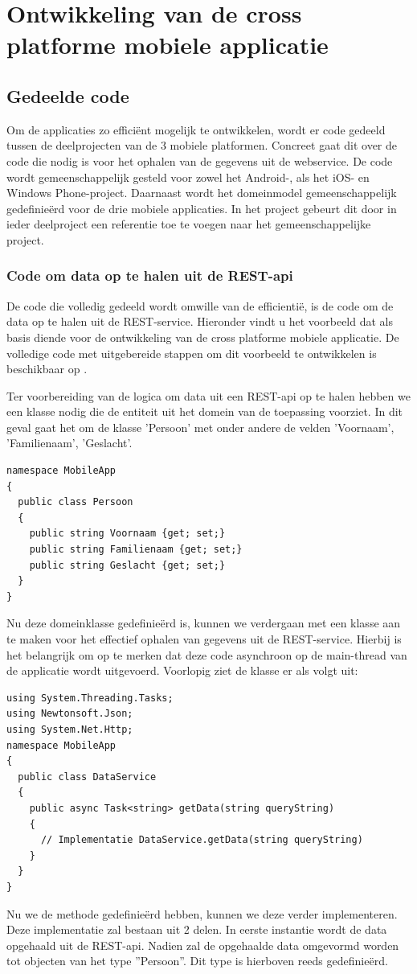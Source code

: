 \section{Ontwikkeling van de cross platforme mobiele applicatie}
\subsection{Gedeelde code}
Om de applicaties zo efficiënt mogelijk te ontwikkelen, wordt er code gedeeld tussen de deelprojecten van de 3 mobiele
platformen. Concreet gaat dit over de code die nodig is voor het ophalen van de gegevens uit de webservice. De code wordt gemeenschappelijk
gesteld voor zowel het Android-, als het iOS- en Windows Phone-project. Daarnaast wordt het domeinmodel gemeenschappelijk
gedefinieërd voor de drie mobiele applicaties. In het project gebeurt dit door in ieder deelproject een referentie toe te voegen
naar het gemeenschappelijke project.

\subsubsection{Code om data op te halen uit de REST-api}
De code die volledig gedeeld wordt omwille van de efficientië, is de code om de data op te halen uit de REST-service.
Hieronder vindt u het voorbeeld dat als basis diende voor de ontwikkeling van de cross platforme mobiele applicatie.
De volledige code met uitgebereide stappen om dit voorbeeld te ontwikkelen is beschikbaar op \citet{buildappwithnativeuiusingxamarininvisualstudio2017}.

Ter voorbereiding van de logica om data uit een REST-api op te halen hebben we een klasse nodig die de entiteit uit het
domein van de toepassing voorziet. In dit geval gaat het om de klasse 'Persoon'  met onder andere de velden 'Voornaam', 'Familienaam', 'Geslacht'.
\newpage
\begin{lstlisting}
namespace MobileApp
{
  public class Persoon
  {
    public string Voornaam {get; set;}
    public string Familienaam {get; set;}
    public string Geslacht {get; set;}
  }
}
\end{lstlisting}
Nu deze domeinklasse gedefinieërd is, kunnen we verdergaan met een klasse aan te maken voor het effectief ophalen van
gegevens uit de REST-service. Hierbij is het belangrijk om op te merken dat deze code asynchroon op de main-thread van de
applicatie wordt uitgevoerd. Voorlopig ziet de klasse er als volgt uit:
\begin{lstlisting}
using System.Threading.Tasks;
using Newtonsoft.Json;
using System.Net.Http;
namespace MobileApp
{
  public class DataService
  {
    public async Task<string> getData(string queryString)
    {
      // Implementatie DataService.getData(string queryString)
    }
  }
}
\end{lstlisting}
Nu we de methode gedefinieërd hebben, kunnen we deze verder implementeren.
Deze implementatie zal bestaan uit 2 delen. In eerste instantie wordt de data opgehaald uit de REST-api. Nadien zal de opgehaalde data
omgevormd worden tot objecten van het type ''Persoon''. Dit type is hierboven reeds gedefinieërd.

